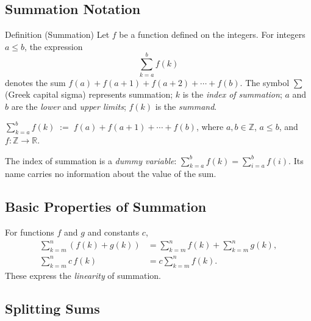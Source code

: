
\subsection{Summation Notation}

\begin{definitionbox}{Definition (Summation)}
Let \(f\) be a function defined on the integers.
For integers \(a \le b\), the expression
\[
\sum_{k=a}^{b} f(k)
\]
denotes the sum \(f(a) + f(a+1) + f(a+2) + \cdots + f(b)\).
The symbol \(\sum\) (Greek capital sigma) represents summation;
\(k\) is the \emph{index of summation}; \(a\) and \(b\) are the
\emph{lower} and \emph{upper limits}; \(f(k)\) is the \emph{summand}.
\end{definitionbox}
\label{def:summation}

\begin{remark*}
\(\displaystyle\sum_{k=a}^{b} f(k) \;:=\; f(a) + f(a+1) + \cdots + f(b)\),
where \(a,b \in \mathbb{Z}\), \(a \le b\), and \(f : \mathbb{Z}\to\mathbb{R}\).
\end{remark*}

\begin{remark*}
The index of summation is a \emph{dummy variable}:
\(\displaystyle\sum_{k=a}^{b} f(k) = \sum_{i=a}^{b} f(i)\).
Its name carries no information about the value of the sum.
\end{remark*}

\subsection*{Basic Properties of Summation}

\begin{remark*}
For functions \(f\) and \(g\) and constants \(c\),
\begin{align*}
\sum_{k=m}^{n} (f(k) + g(k))
&=
\sum_{k=m}^{n} f(k)
+
\sum_{k=m}^{n} g(k), \\[6pt]
\sum_{k=m}^{n} c\,f(k)
&=
c \sum_{k=m}^{n} f(k).
\end{align*}
These express the \emph{linearity} of summation.
\end{remark*}

\subsection*{Splitting Sums}

